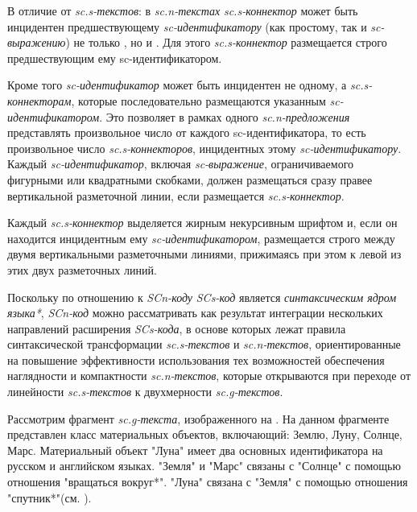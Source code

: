 В отличие от \textit{sc.s-текстов}: в \textit{sc.n-текстах} \textit{sc.s-коннектор} может быть инцидентен предшествующему \textit{sc-идентификатору} (как простому, так и \textit{sc-выражению}) не только , но и . Для этого \textit{sc.s-коннектор} размещается строго  предшествующим ему sc-идентификатором.

Кроме того  \textit{sc-идентификатор} может быть инцидентен не одному, а  \textit{sc.s-коннекторам}, которые последовательно  размещаются  указанным \textit{sc-идентификатором}. Это позволяет в рамках одного \textit{sc.n-предложения} представлять произвольное число  от каждого sc-идентификатора, то есть произвольное число \textit{sc.s-коннекторов}, инцидентных этому \textit{sc-идентификатору}.
Каждый \textit{sc-идентификатор}, включая \textit{sc-выражение}, ограничиваемого фигурными или квадратными скобками, должен размещаться сразу правее вертикальной разметочной линии, если  размещается \textit{sc.s-коннектор}.

Каждый \textit{sc.s-коннектор} выделяется жирным некурсивным шрифтом и, если он находится  инцидентным ему \textit{sc-идентификатором}, размещается строго между двумя вертикальными разметочными линиями, прижимаясь при этом к левой из этих двух разметочных линий.

Поскольку по отношению к \textit{SCn-коду} \textit{SCs-код} является \textit{синтаксическим ядром языка*}, \textit{SCn-код} можно рассматривать как результат интеграции нескольких направлений расширения \textit{SCs-кода}, в основе которых лежат правила синтаксической трансформации \textit{sc.s-текстов} и \textit{sc.n-текстов}, ориентированные на повышение эффективности использования тех возможностей обеспечения наглядности и компактности \textit{sc.n-текстов}, которые открываются при переходе от линейности \textit{sc.s-текстов} к двухмерности \textit{sc.g-текстов}.

Рассмотрим фрагмент \textit{sc.g-текста}, изображенного на \textit{}.
На данном фрагменте представлен класс материальных объектов, включающий: Землю, Луну, Солнце, Марс. Материальный объект "Луна" имеет два основных идентификатора на русском и английском языках. "Земля" и "Марс" связаны с "Солнце" с помощью отношения "вращаться вокруг*". "Луна" связана с "Земля" с помощью отношения "спутник*"(см. ).

